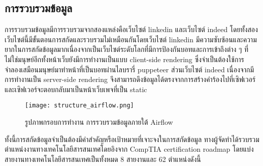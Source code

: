 \subsection{การรวบรวมข้อมูล}
การรวบรวมข้อมูลมีการรวบรวมจากสองแหล่งคือเว็บไซต์ linkedin และเว็บไซต์ indeed โดยทั้งสองเว็บไซต์นี้มีขั้นตอนการสกัดและรวบรวมไม่เหมือนกันโดยเว็บไซต์ linkedin มีความซับซ้อนและความยากในการสกัดข้อมูลมากเนื่องจากเป็นเว็บไซต์ระดับโลกที่มีการป้องกันบอทและการเข้าถึงต่าง ๆ ที่ไม่ใช่มนุษย์อีกทั้งหน้าเว็บยังมีการทำงานเป็นแบบ client-side rendering ซึ่งจำเป็นต้องใช้การจำลองเสมือนมนุษย์มาทำหน้าที่เป็นบอทผ่านไลบรารี่ puppeteer ส่วนเว็บไซต์ indeed เนื่องจากมีการทำงานเป็น server-side rendering จึงสามารถดึงข้อมูลได้ตรงจากการสร้างคำร้องไปที่เซิฟเวอร์และเซิฟเวอร์จะตอบกลับมาเป็นหน้าเว็บเพจที่เป็น static
\newline
\begin{figure}[!h]
  \centering
  \texttt{[image: structure\_airflow.png]}  
  \caption{รูปภาพกรอบการทำงาน การรวบรวมข้อมูลภายใต้ Airflow}
  \label{Fig:data-collection}
\end{figure}
ทั้งนี้การสกัดข้อมูลจำเป็นต้องมีคำสำคัญหรือเป้าหมายที่เจาะจงในการสกัดข้อมูล ทางผู้จัดทำได้รวบรวมตำแหน่งงานทางเทคโนโลยีสารสนเทศโดยอิงจาก CompTIA certification roadmap โดยแบ่งสายงานทางเทคโนโลยีสารสนเทศเป็นทั้งหมด 8 สายงานและ 62 ตำแหน่งดังนี้
\newpage

